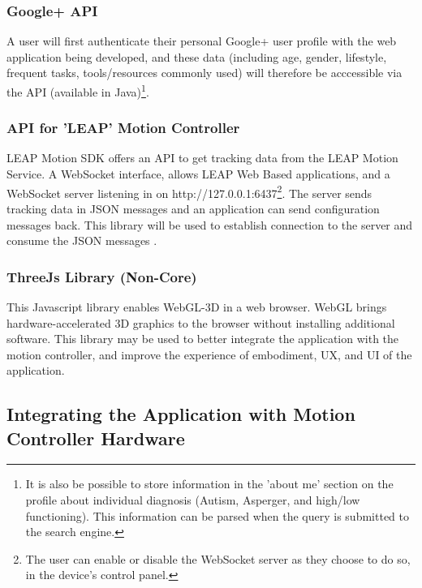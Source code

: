 \documentclass[a4paper, 11pt]{article}
\begin{document}
\subsubsection{Google+ API}
A user will first authenticate their personal Google+ user profile with the web application being developed, and these data (including age, gender, lifestyle, frequent tasks, tools/resources commonly used) will therefore be acccessible via the API (available in Java)\footnote{It is also be possible to store information in the 'about me' section on the profile about individual diagnosis (Autism, Asperger, and high/low functioning). This information can be parsed when the query is submitted to the search engine.}. 

\subsubsection{API for 'LEAP' Motion Controller}
LEAP Motion SDK offers an API to get tracking data from the LEAP Motion Service. A WebSocket interface, allows LEAP Web Based applications, and a WebSocket server listening in on http://127.0.0.1:6437\footnote{The user can enable or disable the WebSocket server as they choose to do so, in the device's control panel.}.
The server sends tracking data in JSON messages and an application can send configuration messages back. This library will be used to establish connection to the server and consume the JSON messages \cite{leap}. 


\subsubsection{ThreeJs Library (Non-Core)}
This Javascript library enables WebGL-3D in a web browser. WebGL brings hardware-accelerated 3D graphics to the browser without installing additional software. This library may be used to better integrate the application with the motion controller, and improve the experience of embodiment, UX, and UI of the application.


\subsection{Integrating the Application with Motion Controller Hardware }\label{hardware}
\end{document}
